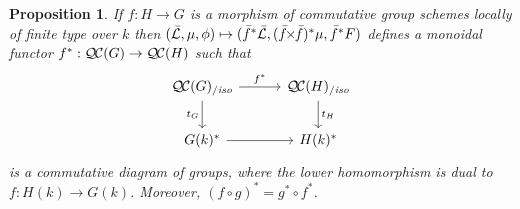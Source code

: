 \documentclass[11pt]{amsart}
\theoremstyle{plain}
\newtheorem{proposition}[theorem]{Proposition}
\theoremstyle{definition}
\theoremstyle{remark}
\newcommand{\EE}{\mathbb{\bar Q}_\ell}
\newcommand{\Fq}{k}
\newcommand{\EEx}{\EE^\times}
\DeclareMathOperator{\Hom}{Hom}
\newcommand{\gqcs}[1]{{\mathcal{\bar #1}}}
\newcommand{\QC}{{\mathcal{Q\hskip-0.8pt C}}}
\newcommand{\QCiso}[1]{\QC(#1)_{/\textit{iso}}}
\newcommand{\trFrob}[1]{t_{#1}}
\renewcommand{\bf}{\bar{f}}
\newcommand{\tight}[3]{\hspace{-#1pt}{#2}\hspace{-#3pt}}
\newcommand{\bfxf}{\text{$\bar{f} \tight{1}{\times}{1} \bar{f}$}}
\begin{document}
\begin{proposition}\label{prop:pullback}
  If $f : H\to G$ is a morphism of commutative group schemes locally of finite type over $\Fq$ then
  $(\gqcs{L},\mu,\phi) \mapsto (\bf^*\gqcs{L},(\bfxf)^*\mu,\bf^*F)$
  defines a monoidal functor $f^* : \QC(G) \to \QC(H)$ such that
  \[
  \begin{tikzcd}[row sep=20, column sep=30]
   \QCiso{G} \rar{f^*} \arrow[swap]{d}{\trFrob{G}} & \QCiso{H} \dar{\trFrob{H}} \\
   G(\Fq)^* \rar & H(\Fq)^*
  \end{tikzcd}
  \]
  is a commutative diagram of groups, where the lower homomorphism is
  dual to $f : H(\Fq)\to G(\Fq)$.  Moreover, $(f\circ g)^* = g^* \circ f^*$.
\end{proposition}
\end{document}
